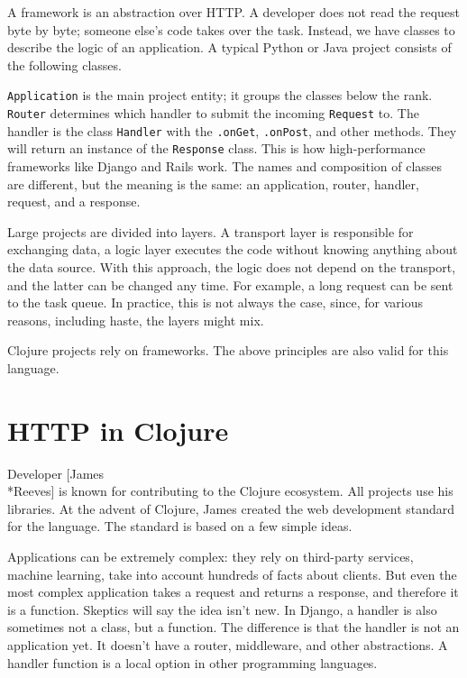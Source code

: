 
A framework is an abstraction over HTTP. A developer does not read the request byte by byte; someone else's code takes over the task. Instead, we have classes to describe the logic of an application. A typical Python or Java project consists of the following classes.

\verb|Application| is the main project entity; it groups the classes below the rank. \verb|Router| determines which handler to submit the incoming \verb|Request| to. The handler is the class \verb|Handler| with the \verb|.onGet|, \verb|.onPost|, and other methods. They will return an instance of the \verb|Response| class. This is how high-performance frameworks like Django and Rails work. The names and composition of classes are different, but the meaning is the same: an application, router, handler, request, and a response.


Large projects are divided into layers. A transport layer is responsible for exchanging data, a logic layer executes the code without knowing anything about the data source. With this approach, the logic does not depend on the transport, and the latter can be changed any time. For example, a long request can be sent to the task queue. In practice, this is not always the case, since, for various reasons, including haste, the layers might mix.

Clojure projects rely on frameworks. The above principles are also valid for this language.

\section{HTTP in Clojure}


Developer [James\\*Reeves] is known for contributing to the Clojure ecosystem.  All projects use his libraries.  At the advent of Clojure, James created the web development standard for the language. The standard is based on a few simple ideas.

Applications can be extremely complex: they rely on third-party services, machine learning, take into account hundreds of facts about clients. But even the most complex application takes a request and returns a response, and therefore it is a function. Skeptics will say the idea isn't new. In Django, a handler is also sometimes not a class,
but a function. The difference is that the handler is not an application yet. It doesn't have a router, middleware, and other abstractions. A handler function is a local option in other programming languages.

